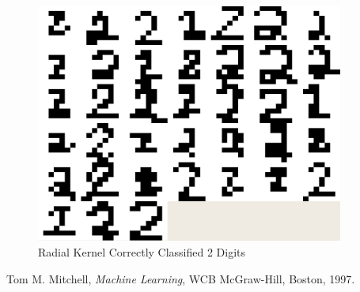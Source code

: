 \documentclass{article}
\begin{document}
\begin{figure}
\centering
\includegraphics[width=0.9\textwidth]{images/test2_5_correct2_radial.png}
\caption{Radial Kernel Correctly Classified 2 Digits}
\label{radial2correcttest}
\end{figure}

\begin{thebibliography}{9}

  Tom M. Mitchell,
  \emph{Machine Learning},
  WCB McGraw-Hill, Boston,
  1997.

\end{thebibliography}
\end{document}
